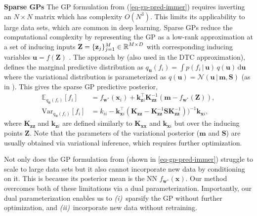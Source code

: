 \documentclass{article}
\newcommand{\dataset}{\ensuremath{\mathcal{D}}}
\newcommand{\mbf}[1]{\mathbf{#1}}
\renewcommand{\mid}{\,|\,}
\newcommand{\MS}{\mbf{S}}
\newcommand{\MZ}{\mbf{Z}}
\newcommand{\vm}{\mbf{m}}
\newcommand{\vz}{\mbf{z}}
\newcommand{\vu}{\mbf{u}}
\newcommand{\vx}{\mbf{x}}
\newcommand{\vw}{\mbf{w}}
\newcommand{\MKzz}{\mbf{K}_{\mbf{z}\mbf{z}}}
\newcommand{\MKxx}{\mbf{K}_{\mbf{x}\mbf{x}}}
\newcommand{\vkzs}{\mbf{k}_{\mbf{z}i}}
\newcommand{\vk}{\mbf{k}}
\newcommand{\myexpect}{\mathbb{E}}
\begin{document}
\textbf{Sparse GPs}
The GP formulation from \citet{immer2021improving} (\cref{eq-gp-pred-immer})
requires inverting an $N\times N$ matrix which has complexity $O(N^3)$.
This limits its applicability to large data sets, which are common in deep learning.
Sparse GPs reduce the computational complexity by representing the GP as a low-rank approximation at a set of inducing
inputs $\MZ = \{\vz_{j} \}_{j=1}^{M} \in \R^{M \times D}$ with corresponding inducing variables $\vu = f(\MZ)$ \citep[see][for an early overview]{quinonero2005unifying}.
The approach by \citet{titsias2009variational} (also used in the DTC approximation),
defines the marginal predictive distribution as $q_{\vu}(f_i)  = \int p(f_i  \mid \vu) \, q(\vu) \, \mathrm{d}\vu$ where
the variational distribution is parameterized as $q(\vu) = \mathcal{N}\left(\vu \mid \vm, \MS \right)$ (as in \citet{titsias2009variational,hensman2013gaussian}).
This gives the sparse GP predictive posterior,
\begin{subequations}  \label{eq-svgp-pred}
\begin{align}
  \myexpect_{q_{\vu}(f_i)}[f_i] &= f_{\vw^{*}}(\vx_{i}) + \vk_{\vz i}^{\top}\MKzz^{-1}(\vm - f_{\vw^{*}}(\MZ)), \\
  \mathrm{Var}_{q_{\vu}(f_i)}[f_i] &= k_{ii} - \vk_{\vx i}^\top ( \MKzz -  \MKzz^{-1}\MS  \MKzz^{-1}))^{-1} \vk_{\vx i},  \nonumber
\end{align}
\end{subequations}
where $\MKzz$ and $\vkzs$ are defined similarly to $\MKxx$ and $\vk_{\vx i}$ but over the inducing points $\MZ$.%
Note that the parameters of the variational posterior ($\vm$ and $\MS$) are usually obtained via variational
inference, which requires further optimization.%

Not only does the GP formulation from \citet{immer2021improving} (shown in \cref{eq-gp-pred-immer}) struggle to scale to large
data sets but it also cannot incorporate new data by conditioning on it.
This is because its posterior mean is the NN  $f_{\vw^*}(\vx)$.
Our method overcomes both of these limitations via a dual parameterization.
Importantly, our dual parameterization enables us to {\em (i)}~sparsify the GP without further optimization, and {\em (ii)}~incorporate new data without retraining. %

\end{document}
